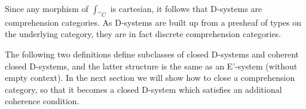 \begin{comment}
The term $\delta_A\in\mathrm{Tm}((p_A)_\ast(A))$ is defined to be the unique morphism
such that the diagram
\begin{equation*}
\begin{tikzcd}[column sep=large]
\ctxext{\Gamma}{A} \arrow[drr,bend left=15,equals] \arrow[ddr,bend right=15,equals] \arrow[dr,densely dotted,near end,"{\delta_{A}}"] \\
& \ctxext{{\Gamma}{A}}{(p_A)_\ast(A)} \arrow[r,swap,"{\pi_2(A,A)}"] \arrow[d,fib] & \ctxext{\Gamma}{A} \arrow[d,fib] \\
& \ctxext{\Gamma}{A} \arrow[r,swap,"A"] & \Gamma
\end{tikzcd}
\end{equation*}
commutes.

The universality assumption of categories with families is a consequence of
the universal property of pullbacks: the map $x\mapsto\pi_2(f,X)\circ x$
from $\{x:\Delta\to\ctxext{\Delta}{f_\ast(A)}\mid p_{f_\ast(A)}\circ x\jdeq\catid{\Delta}\}$
to $\{\theta:\Delta\to\ctxext{\Gamma}{A}\mid p_A\circ\theta\jdeq f\}$ is a bijection.
\end{proof}
\end{comment}

\begin{eg}
Since any morphism of $\int_{\cat{C}}$ is cartesian, it follows that D-systems
are comprehension categories. As D-systems are built up from a presheaf of types
on the underlying category, they are in fact discrete comprehension categories.
\end{eg}

The following two definitions define subclasses of closed D-systems and 
coherent closed D-systems, and the latter structure is the same as an E'-system
(without empty context). In the next section we will show how to close a comprehension
category, so that it becomes a closed D-system which satisfies an additional coherence condition.

